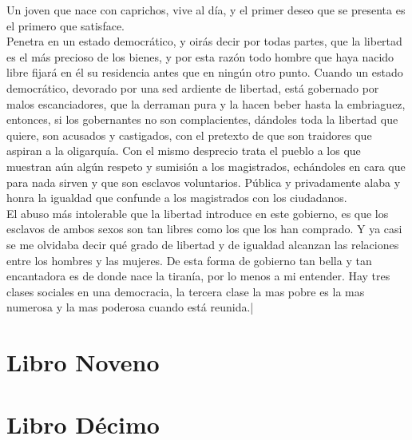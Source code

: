 \documentclass[10pt]{book}
\begin{document}
Un joven que nace con caprichos, vive al día, y el primer deseo que se presenta es el primero que satisface.\\
Penetra en un estado democrático, y oirás decir por todas partes, que la libertad es el más precioso de los bienes, y por esta razón todo hombre que haya nacido libre fijará en él su residencia antes que en ningún otro punto. Cuando un estado democrático, devorado por una sed ardiente de libertad, está gobernado por malos escanciadores, que la derraman pura y la hacen beber hasta la embriaguez, entonces, si los gobernantes no son complacientes, dándoles toda la libertad que quiere, son acusados y castigados, con el pretexto de que son traidores que aspiran a la oligarquía. Con el mismo desprecio trata el pueblo a los que muestran aún algún respeto y sumisión a los magistrados, echándoles en cara que para nada sirven y que son esclavos voluntarios. Pública y privadamente alaba y honra la igualdad que confunde a los magistrados con los ciudadanos.\\ 
El abuso más intolerable que la libertad introduce en este gobierno, es que los esclavos de ambos sexos son tan libres como los que los han comprado. Y ya casi se me olvidaba decir qué grado de libertad y de igualdad alcanzan las relaciones entre los hombres y las mujeres. De esta forma de gobierno tan bella y tan encantadora es de donde nace la tiranía, por lo menos a mi entender. Hay tres clases sociales en una democracia, la tercera clase la mas pobre es la mas numerosa y la mas poderosa cuando está reunida.|
\chapter*{Libro Noveno}

\chapter*{Libro Décimo}
 
\end{document}
